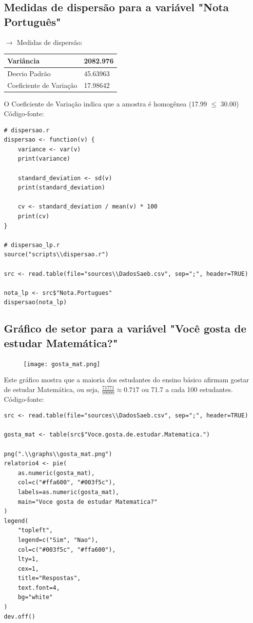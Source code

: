 \documentclass[17pt]{extarticle}
\begin{document}
\subsection{Medidas de dispersão para a variável "Nota Português"}
$\rightarrow$ Medidas de dispersão:
\begin{table}[H]
\begin{tabular}{|l|l|}
\hline
Variância   & 2082.976 \\ \hline
Desvio Padrão & 45.63963      \\ \hline
Coeficiente de Variação    & 17.98642      \\ \hline
\end{tabular}
\end{table}
\noindent
O Coeficiente de Variação indica que a amostra é homogênea (17.99 $\le$ 30.00) \\
Código-fonte:
\begin{lstlisting}
# dispersao.r
dispersao <- function(v) {
    variance <- var(v)
    print(variance)

    standard_deviation <- sd(v)
    print(standard_deviation)

    cv <- standard_deviation / mean(v) * 100
    print(cv)
}

# dispersao_lp.r
source("scripts\\dispersao.r")

src <- read.table(file="sources\\DadosSaeb.csv", sep=";", header=TRUE)

nota_lp <- src$"Nota.Portugues"
dispersao(nota_lp)
\end{lstlisting}

\newpage
\subsection{Gráfico de setor para a variável "Você gosta de estudar Matemática?"}
\begin{figure}[H]
    \texttt{[image: gosta\_mat.png]}
    \centering
\end{figure}
Este gráfico mostra que a maioria dos estudantes do ensino básico afirmam gostar de estudar Matemática, ou seja, \(\frac{71771}{99999} \approx 0.717\) ou 71.7 a cada 100 estudantes. \newline
Código-fonte:
\begin{lstlisting}
src <- read.table(file="sources\\DadosSaeb.csv", sep=";", header=TRUE)

gosta_mat <- table(src$"Voce.gosta.de.estudar.Matematica.")

png(".\\graphs\\gosta_mat.png")
relatorio4 <- pie(
    as.numeric(gosta_mat),
    col=c("#ffa600", "#003f5c"),
    labels=as.numeric(gosta_mat),
    main="Voce gosta de estudar Matematica?"
)
legend(
    "topleft",
    legend=c("Sim", "Nao"),
    col=c("#003f5c", "#ffa600"),
    lty=1,
    cex=1,
    title="Respostas",
    text.font=4,
    bg="white"
)
dev.off()
\end{lstlisting}
\end{document}
